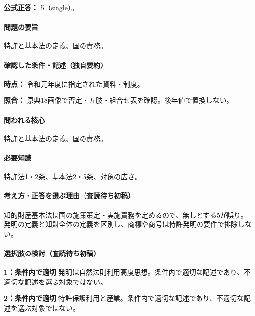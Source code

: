 \textbf{公式正答：} 5（single）。

\paragraph{問題の要旨} 特許と基本法の定義、国の責務。

\paragraph{確認した条件・記述（独自要約）}\mbox{}\par

\noindent\textbf{時点：} 令和元年度に指定された資料・制度。\par

\noindent\textbf{照合：} 原典18画像で否定・五肢・組合せ表を確認。後年値で置換しない。\par

\paragraph{問われる核心} 特許と基本法の定義、国の責務。

\paragraph{必要知識} 特許法1・2条、基本法2・5条、対象の広さ。

\paragraph{考え方・正答を選ぶ理由（査読待ち初稿）} 知的財産基本法は国の施策策定・実施責務を定めるので、無しとする5が誤り。発明の定義と知財全体の定義を区別し、商標や商号は特許発明の要件で排除しない。

\paragraph{選択肢の検討（査読待ち初稿）}\mbox{}\par

\noindent\textbf{1：条件内で適切} 発明は自然法則利用高度思想。条件内で適切な記述であり、不適切な記述を選ぶ対象ではない。\par

\noindent\textbf{2：条件内で適切} 特許保護利用と産業。条件内で適切な記述であり、不適切な記述を選ぶ対象ではない。\par

